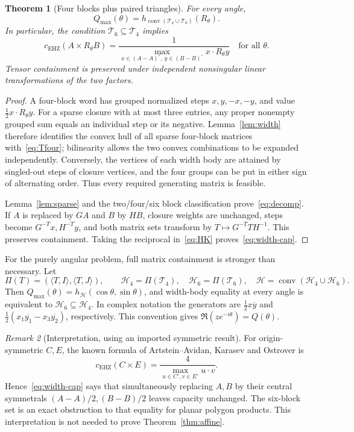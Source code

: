 \documentclass[11pt,a4paper]{article}
\newtheorem{theorem}{Theorem}[section]
\theoremstyle{definition}\newtheorem{definition}[theorem]{Definition}
\theoremstyle{remark}\newtheorem{remark}[theorem]{Remark}
\newcommand{\conv}{\operatorname{conv}}
\newcommand{\capc}{c_{\mathrm{EHZ}}}
\newcommand{\Tfour}{\mathcal T_4}
\newcommand{\Tsix}{\mathcal T_6}
\newcommand{\Hfour}{\mathcal H_4}
\newcommand{\Hsix}{\mathcal H_6}
\newcommand{\ip}[2]{\langle #1,#2\rangle}
\begin{document}
\begin{theorem}[Four blocks plus paired triangles]\label{thm:decomp}
For every angle,
\begin{equation}\label{eq:decomp}
 Q_{\max}(\theta)=h_{\conv(\Tfour\cup\Tsix)}(R_\theta).
\end{equation}
In particular, the condition $\Tsix\subseteq\Tfour$ implies
\begin{equation}\label{eq:width-cap}
 \boxed{\displaystyle
 \capc(A\times R_\theta B)
 =\frac{1}{\max_{x\in(A-A)^\circ,\ y\in(B-B)^\circ}x\cdot R_\theta y}}
 \quad\text{for all }\theta.
\end{equation}
Tensor containment is preserved under independent nonsingular linear transformations of the two factors.
\end{theorem}
\begin{proof}
A four-block word has grouped normalized steps $x,y,-x,-y$, and value $\frac12x\cdot R_\theta y$. For a sparse closure with at most three entries, any proper nonempty grouped sum equals an individual step or its negative. Lemma~\ref{lem:width} therefore identifies the convex hull of all sparse four-block matrices with~\eqref{eq:Tfour}; bilinearity allows the two convex combinations to be expanded independently. Conversely, the vertices of each width body are attained by singled-out steps of closure vertices, and the four groups can be put in either sign of alternating order. Thus every required generating matrix is feasible.

Lemma~\ref{lem:sparse} and the two/four/six block classification prove~\eqref{eq:decomp}. If $A$ is replaced by $GA$ and $B$ by $HB$, closure weights are unchanged, steps become $G^{-T}x,H^{-T}y$, and both matrix sets transform by $T\mapsto G^{-T}TH^{-1}$. This preserves containment. Taking the reciprocal in~\eqref{eq:HK} proves~\eqref{eq:width-cap}.
\end{proof}

For the purely angular problem, full matrix containment is stronger than necessary. Let
\[
 \Pi(T)=(\ip TI,\ip TJ),\qquad
 \Hfour=\Pi(\Tfour),\quad \Hsix=\Pi(\Tsix),\quad
 \mathcal H=\conv(\Hfour\cup\Hsix).
\]
Then $Q_{\max}(\theta)=h_{\mathcal H}(\cos\theta,\sin\theta)$, and width-body equality at every angle is equivalent to $\Hsix\subseteq\Hfour$. In complex notation the generators are $\frac12x\overline y$ and $\frac12(x_1\overline{y_1}-x_3\overline{y_2})$, respectively. This convention gives $\Re(ze^{-i\theta})=Q(\theta)$.

\begin{remark}[Interpretation, using an imported symmetric result]
For origin-symmetric $C,E$, the known formula of Artstein--Avidan, Karasev and Ostrover \cite[Eq. (1.4.3), Remark 4.2]{AAKO} is
\[
 \capc(C\times E)=\frac4{\max_{u\in C^\circ,v\in E^\circ}u\cdot v}.
\]
Hence~\eqref{eq:width-cap} says that simultaneously replacing $A,B$ by their central symmetrals $(A-A)/2,(B-B)/2$ leaves capacity unchanged. The six-block set is an exact obstruction to that equality for planar polygon products. This interpretation is not needed to prove Theorem~\ref{thm:affine}.
\end{remark}
\end{document}
